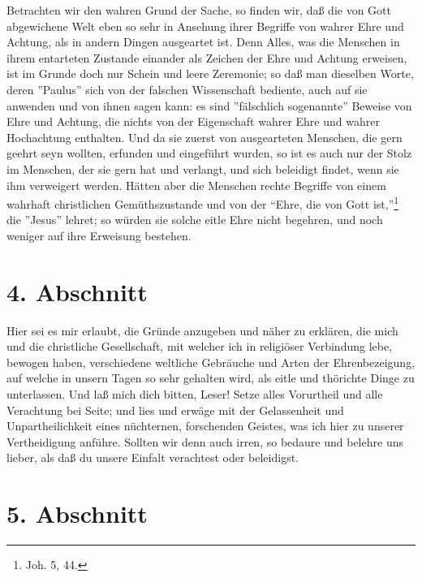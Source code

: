 Betrachten wir den wahren Grund der Sache, so finden wir, daß die von Gott
abgewichene Welt eben so sehr in Ansehung ihrer Begriffe von wahrer Ehre und
Achtung, als in andern Dingen ausgeartet ist. Denn Alles, was die Menschen in
ihrem entarteten Zustande einander als Zeichen der Ehre und Achtung erweisen,
ist im Grunde doch nur Schein und leere Zeremonie; so daß man dieselben Worte,
deren ''Paulus'' sich von der falschen Wissenschaft bediente, auch auf sie
anwenden und von ihnen sagen kann: es sind ''fälschlich sogenannte'' Beweise von
Ehre und Achtung, die nichts von der Eigenschaft wahrer Ehre und wahrer
Hochachtung enthalten. Und da sie zuerst von ausgearteten Menschen, die gern
geehrt seyn wollten, erfunden und eingeführt wurden, so ist es auch nur der
Stolz im Menschen, der sie gern hat und verlangt, und sich beleidigt findet,
wenn sie ihm verweigert werden. Hätten aber die Menschen rechte Begriffe von
einem wahrhaft christlichen Gemüthszustande und von der "`Ehre, die von Gott
ist,"'\footnote{Joh. 5, 44.} die ''Jesus'' lehret; so würden sie solche eitle
Ehre nicht begehren, und noch weniger auf ihre Erweisung bestehen.

\section{4. Abschnitt} \label{kap9_ab4}

Hier sei es mir erlaubt, die Gründe anzugeben und näher zu erklären, die mich
und die christliche Gesellschaft, mit welcher ich in religiöser Verbindung lebe,
bewogen haben, verschiedene weltliche Gebräuche und Arten der Ehrenbezeigung,
auf welche in unsern Tagen so sehr gehalten wird, als eitle und thörichte Dinge
zu unterlassen. Und laß mich dich bitten, Leser! Setze alles Vorurtheil und alle
Verachtung bei Seite; und lies und erwäge mit der Gelassenheit und
Unpartheilichkeit eines nüchternen, forschenden Geistes, was ich hier zu unserer
Vertheidigung anführe. Sollten wir denn auch irren, so bedaure und belehre uns
lieber, als daß du unsere Einfalt verachtest oder beleidigst.

\section{5. Abschnitt} \label{kap9_ab5}

